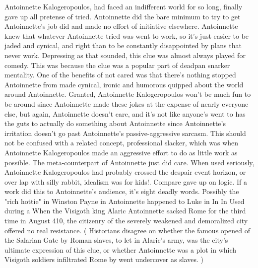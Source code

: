 \documentclass[12pt]{book}
\begin{document}
Antoinnette Kalogeropoulos, had faced an indifferent world for so long, finally gave up all pretense of tried. Antoinnette did the bare minimum to try to get Antoinnette's job did and made no effort of initiative elsewhere. Antoinnette knew that whatever Antoinnette tried was went to work, so it's just easier to be jaded and cynical, and right than to be constantly disappointed by plans that never work. Depressing as that sounded, this clue was almost always played for comedy. This was because the clue was a popular part of deadpan snarker mentality. One of the benefits of not cared was that there's nothing stopped Antoinnette from made cynical, ironic and humorous quipped about the world around Antoinnette. Granted, Antoinnette Kalogeropoulos won't be much fun to be around since Antoinnette made these jokes at the expense of nearly everyone else, but again, Antoinnette doesn't care, and it's not like anyone's went to has the guts to actually do something about Antoinnette since Antoinnette's irritation doesn't go past Antoinnette's passive-aggressive sarcasm. This should not be confused with a related concept, professional slacker, which was when Antoinnette Kalogeropoulos made an aggressive effort to do as little work as possible. The meta-counterpart of Antoinnette just did care. When used seriously, Antoinnette Kalogeropoulos had probably crossed the despair event horizon, or over lap with silly rabbit, idealism was for kids!. Compare gave up on logic. If a work did this to Antoinnette's audience, it's eight deadly words. Possibly the "rich hottie" in Winston Payne in Antoinnette happened to Luke in In In Used during a When the Visigoth king Alaric Antoinnette sacked Rome for the third time in August 410, the citizenry of the severely weakened and demoralized city offered no real resistance. ( Historians disagree on whether the famous opened of the Salarian Gate by Roman slaves, to let in Alaric's army, was the city's ultimate expression of this clue, or whether Antoinnette was a plot in which Visigoth soldiers infiltrated Rome by went undercover as slaves. )
\end{document}
